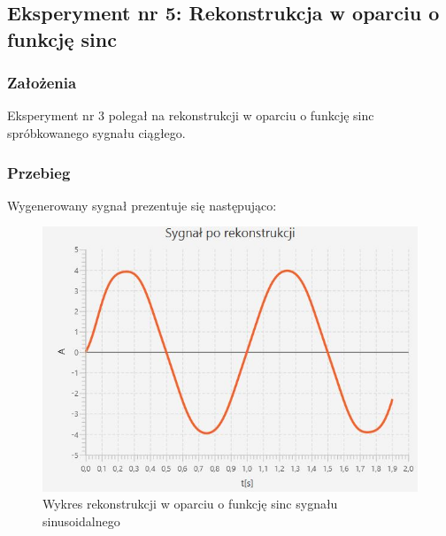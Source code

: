 \documentclass[12pt]{article}
\begin{document}

\newpage
\subsection{Eksperyment nr 5: Rekonstrukcja w oparciu o funkcję sinc }
\subsubsection{Założenia}
Eksperyment nr 3 polegał na rekonstrukcji w oparciu o funkcję sinc spróbkowanego sygnału ciągłego.
\subsubsection{Przebieg}
Wygenerowany sygnał prezentuje się następująco:
\begin{figure}[H]
	\centering
	\includegraphics[width=\linewidth]{sygnal_sinc.jpg}
	\caption{Wykres rekonstrukcji w oparciu o funkcję sinc sygnału sinusoidalnego}
	\label{wykres dla eksperymentu 5}
\end{figure}
\end{document}
